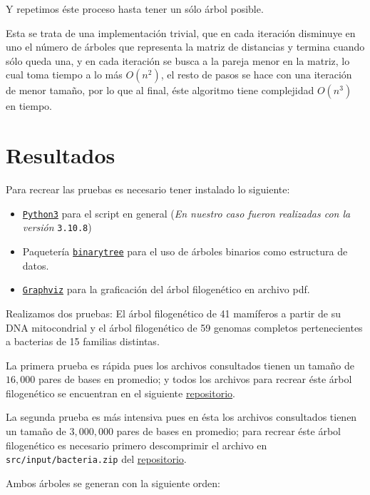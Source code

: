 \documentclass[12pt]{article}
\begin{document}
Y repetimos éste proceso hasta tener un sólo árbol posible.

Esta se trata de una implementación trivial, que en cada iteración disminuye en uno el número de árboles que representa la matriz de distancias y termina cuando sólo queda una, y en cada iteración se busca a la pareja menor en la matriz, lo cual toma tiempo a lo más $O(n^2)$, el resto de pasos se hace con una iteración de menor tamaño, por lo que al final, éste algoritmo tiene complejidad $O(n^3)$ en tiempo.

\section{Resultados}

\noindent Para recrear las pruebas es necesario tener instalado lo siguiente:

\begin{itemize}
\item \href{https://www.python.org/}{\texttt{Python3}} para el script en general (\textit{En nuestro caso fueron realizadas con la versión }\texttt{3.10.8})
\item Paquetería \href{https://github.com/joowani/binarytree#installation}{\texttt{binarytree}} para el uso de árboles binarios como estructura de datos.
\item \href{https://graphviz.org/}{\texttt{Graphviz}} para la graficación del árbol filogenético en archivo pdf.
\end{itemize}

Realizamos dos pruebas: El árbol filogenético de 41 mamíferos a partir de su DNA mitocondrial y el árbol filogenético de 59 genomas completos pertenecientes a bacterias de 15 familias distintas.

La primera prueba es rápida pues los archivos consultados tienen un tamaño de $16,000$ pares de bases en promedio; y todos los archivos para recrear éste árbol filogenético se encuentran en el siguiente \href{https://gitlab.com/pppkizbroutle/proyecto-genomica/-/tree/master/src}{repositorio}.

La segunda prueba es más intensiva pues en ésta los archivos consultados tienen un tamaño de $3,000,000$ pares de bases en promedio; para recrear éste árbol filogenético es necesario primero descomprimir el archivo en \texttt{src/input/bacteria.zip} del \href{https://gitlab.com/pppkizbroutle/proyecto-genomica/-/tree/master/src}{repositorio}.

Ambos árboles se generan con la siguiente orden:
\end{document}
